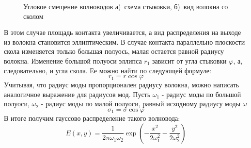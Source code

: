 \begin{figure}[h!]
	\begin{minipage}[h]{0.49\linewidth}
	\end{minipage}
	\hfill
	\begin{minipage}[h]{0.49\linewidth}
	\end{minipage}
	\caption{Угловое смещение волноводов а)~схема стыковки, б)~вид волокна со сколом}
	\label{angular_movement}
\end{figure}

В этом случае площадь контакта увеличивается, а вид распределения на выходе из волокна становится эллиптическим. В случае контакта параллельно плоскости скола изменяется только большая полуось, малая остается равной радиусу волокна. Изменение большой полуоси эллипса $r_1$ зависит от угла стыковки $\varphi$, а, следовательно, и угла скола. Ее можно найти по следующей формуле:
\begin{equation}
	r_1 = r \cos \varphi
	\label{ellipse_axis}
\end{equation}
Учитывая, что радиус моды пропорционален радиусу волокна, можно написать аналогичное выражение для радиусов мод. Пусть $\omega_1$ - радиус моды по большой полуоси, $\omega_2$ - радиус моды по малой полуоси, равный исходному радиусу моды $\omega$
\begin{equation}
	\sigma_1 = \sigma \cos \varphi
	\label{ellipse_axis}
\end{equation}
В итоге получим гауссово распределение такого волновода:
\begin{equation}
  E(x,y)=\frac{1}{2\pi\omega_1\omega_2}\exp\left(-\frac{x^2}{2\omega_1^2}-\frac{y^2}{2\omega_2^2}\right)
\end{equation}
